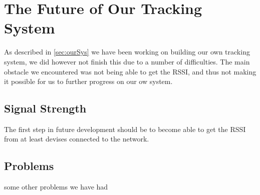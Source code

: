 \section{The Future of Our Tracking System}\label{sec:futureSystem}
As described in \cref{sec:ourSys} we have been working on building our own tracking system, we did however not finish this due to a number of difficulties. The main obstacle we encountered was not being able to get the RSSI, and thus not making it possible for us to further progress on our ow system.
\subsection*{Signal Strength}
The first step in future development should be to become able to get the RSSI from at least devises connected to the network.

\subsection*{Problems}
some other problems we have had